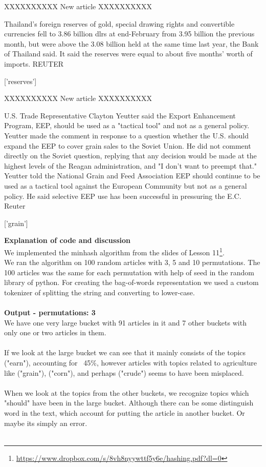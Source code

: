 \documentclass{article}
\begin{document}
\begin{pythonOutput}
['acq']

XXXXXXXXXX
New article
XXXXXXXXXX

Thailand's foreign reserves of gold,
special drawing rights and convertible currencies fell to 3.86
billion dlrs at end-February from 3.95 billion the previous
month, but were above the 3.08 billion held at the same time
last year, the Bank of Thailand said.
    It said the reserves were equal to about five months' worth
of imports.
 REUTER

['reserves']

XXXXXXXXXX
New article
XXXXXXXXXX

U.S. Trade Representative Clayton
Yeutter said the Export Enhancement Program, EEP, should be
used as a "tactical tool" and not as a general policy.
    Yeutter made the comment in response to a question whether
the U.S. should expand the EEP to cover grain sales to the
Soviet Union.
    He did not comment directly on the Soviet question,
replying that any decision would be made at the highest levels
of the Reagan administration, and "I don't want to preempt that."
    Yeutter told the National Grain and Feed Association EEP
should continue to be used as a tactical tool against the
European Community but not as a general policy. He said
selective EEP use has been successful in pressuring the E.C.
 Reuter

['grain']


\end{pythonOutput}
\textbf{Explanation of code and discussion}\\
We implemented the minhash algorithm from the slides of Lesson 11\footnote{\url{https://www.dropbox.com/s/8vh8nyywttf5y6e/hashing.pdf?dl=0}}.\\
We ran the algorithm on 100 random articles with 3, 5 and 10 permutations. The 100 articles was the same for each permutation with help of seed in the random library of python. For creating the bag-of-words representation we used a custom tokenizer of splitting the string and converting to lower-case.\\
~\\
\textbf{Output - permutations: 3}\\
We have one very large bucket with 91 articles in it and 7 other buckets with only one or two articles in them.\\
~\\
If we look at the large bucket we can see that it mainly consists of the topics ("earn"), accounting for ~45\%, however articles with topics related to agriculture like ("grain"), ("corn"), and perhaps ("crude") seems to have been misplaced.\\
~\\
When we look at the topics from the other buckets, we recognize topics which "should" have been in the large bucket. Although there can be some distinguish word in the text, which account for putting the article in another bucket. Or maybe its simply an error. \\
~\\
\end{document}
